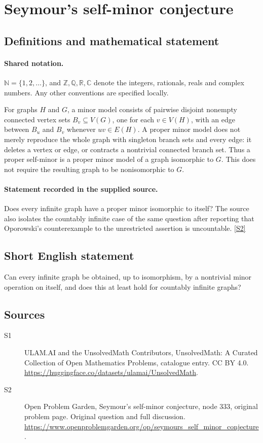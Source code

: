 \documentclass[11pt]{article}
\newcommand{\sref}[2]{\hyperlink{source:#1:#2}{[S#2]}}
\begin{document}
\section{Seymour's self-minor conjecture}\label{statement}

\subsection{Definitions and mathematical statement}

\paragraph{Shared notation.}$\mathbb N=\{1,2,\ldots\}$, and $\mathbb Z,\mathbb Q,\mathbb R,\mathbb C$ denote the integers, rationals, reals and complex numbers. Any other conventions are specified locally.


For graphs $H$ and $G$, a minor model consists of pairwise disjoint nonempty connected vertex sets $B_v\subseteq V(G)$, one for each $v\in V(H)$, with an edge between $B_u$ and $B_v$ whenever $uv\in E(H)$. A proper minor model does not merely reproduce the whole graph with singleton branch sets and every edge: it deletes a vertex or edge, or contracts a nontrivial connected branch set. Thus a proper self-minor is a proper minor model of a graph isomorphic to $G$. This does not require the resulting graph to be nonisomorphic to $G$.
\paragraph{Statement recorded in the supplied source.}
Does every infinite graph have a proper minor isomorphic to itself? The source also isolates the countably infinite case of the same question after reporting that Oporowski's counterexample to the unrestricted assertion is uncountable. \sref{statement}{2}
\subsection{Short English statement}
Can every infinite graph be obtained, up to isomorphism, by a nontrivial minor operation on itself, and does this at least hold for countably infinite graphs?
\subsection{Sources}
\begin{description}
\item[\hypertarget{source:statement:1}{S1}] ULAM.AI and the UnsolvedMath Contributors, UnsolvedMath: A Curated Collection of Open Mathematics Problems, catalogue entry. CC BY 4.0. \url{https://huggingface.co/datasets/ulamai/UnsolvedMath}.
\item[\hypertarget{source:statement:2}{S2}] Open Problem Garden, Seymour's self-minor conjecture, node 333, original problem page. Original question and full discussion. \url{https://www.openproblemgarden.org/op/seymours_self_minor_conjecture}.

\end{description}
\label{end:statement}
\end{document}
